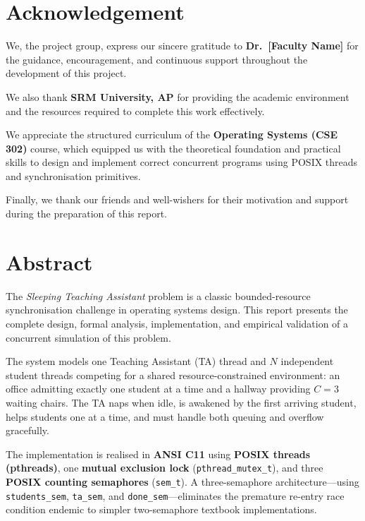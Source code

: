 \documentclass[12pt,a4paper]{report}
\begin{document}
\chapter*{Acknowledgement}

We, the project group, express our sincere gratitude to \textbf{Dr.\ [Faculty Name]} for the
guidance, encouragement, and continuous support throughout the development of this project.

We also thank \textbf{SRM University, AP} for providing the academic environment and the
resources required to complete this work effectively.

We appreciate the structured curriculum of the \textbf{Operating Systems (CSE 302)} course,
which equipped us with the theoretical foundation and practical skills to design and implement
correct concurrent programs using POSIX threads and synchronisation primitives.

Finally, we thank our friends and well-wishers for their motivation and support during the
preparation of this report.

\clearpage

\chapter*{Abstract}

The \textit{Sleeping Teaching Assistant} problem is a classic bounded-resource
synchronisation challenge in operating systems design. This report presents the complete
design, formal analysis, implementation, and empirical validation of a concurrent simulation
of this problem.

The system models one Teaching Assistant (TA) thread and $N$ independent student threads
competing for a shared resource-constrained environment: an office admitting exactly one
student at a time and a hallway providing $C = 3$ waiting chairs. The TA naps when idle, is
awakened by the first arriving student, helps students one at a time, and must handle both
queuing and overflow gracefully.

The implementation is realised in \textbf{ANSI C11} using \textbf{POSIX threads (pthreads)},
one \textbf{mutual exclusion lock} (\texttt{pthread\_mutex\_t}), and three
\textbf{POSIX counting semaphores} (\texttt{sem\_t}). A three-semaphore architecture---using
\texttt{students\_sem}, \texttt{ta\_sem}, and \texttt{done\_sem}---eliminates the premature
re-entry race condition endemic to simpler two-semaphore textbook implementations.
\end{document}
